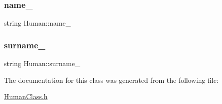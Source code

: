 \subsubsection{\texorpdfstring{name\_}{name\_}}
{\footnotesize\ttfamily string Human\+::name\+\_\+\hspace{0.3cm}{\ttfamily [protected]}}

\mbox{\label{class_human_aa6632ccd30ebfa087e0d875b2d50340c}} 
\subsubsection{\texorpdfstring{surname\_}{surname\_}}
{\footnotesize\ttfamily string Human\+::surname\+\_\+\hspace{0.3cm}{\ttfamily [protected]}}



The documentation for this class was generated from the following file\+:\begin{DoxyCompactItemize}
\item 
\mbox{\hyperlink{_human_class_8h}{Human\+Class.\+h}}\end{DoxyCompactItemize}

